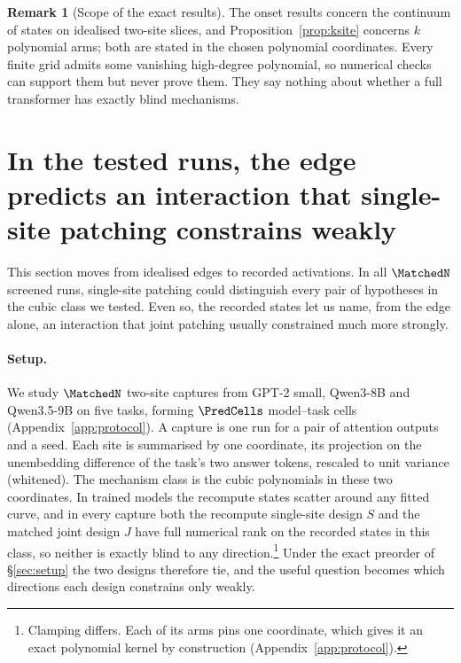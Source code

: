 \documentclass{article}
\theoremstyle{plain}
\theoremstyle{definition}
\newtheorem{remark}[theorem]{Remark}
\begin{document}
\begin{remark}[Scope of the exact results]
\label{rem:scope}
The onset results concern the continuum of states on idealised two-site slices, and
Proposition~\ref{prop:ksite} concerns $k$ polynomial arms; both are stated in the chosen polynomial coordinates. Every
finite grid admits some vanishing high-degree polynomial, so numerical checks can support them but never prove them.
They say nothing about whether a full transformer has exactly blind mechanisms.
\end{remark}

\section{In the tested runs, the edge predicts an interaction that single-site patching constrains weakly}
\label{sec:practical}

This section moves from idealised edges to recorded activations. In all $\MatchedN$ screened runs, single-site
patching could distinguish every pair of hypotheses in the cubic class we tested. Even so, the recorded states let us
name, from the edge alone, an interaction that joint patching usually constrained much more strongly.

\paragraph{Setup.} We study $\MatchedN$ two-site captures from GPT-2 small, Qwen3-8B and Qwen3.5-9B on five tasks,
forming $\PredCells$ model--task cells (Appendix~\ref{app:protocol}). A capture is one run for a pair of attention
outputs and a seed. Each site is summarised by one coordinate, its projection on the unembedding difference of the
task's two answer tokens, rescaled to unit variance (whitened). The mechanism class is the cubic polynomials in these
two coordinates. In trained models the recompute states scatter around any fitted curve, and in every capture both the
recompute single-site design $S$ and the matched joint design $J$ have full numerical rank on the recorded states in
this class, so neither is exactly blind to any direction.\footnote{Clamping differs. Each of its arms pins one
coordinate, which gives it an exact polynomial kernel by construction (Appendix~\ref{app:protocol}).} Under the exact
preorder of \S\ref{sec:setup} the two designs therefore tie, and the useful question becomes which directions each
design constrains only weakly.
\end{document}
